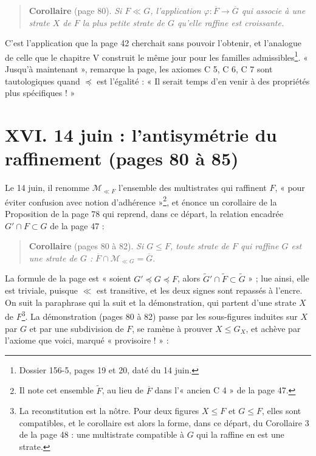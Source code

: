 \documentclass[11pt,a4paper]{article}
\begin{document}
\begin{quote}
\textbf{Corollaire} (page 80). \emph{Si $F \ll G$, l'application $\varphi :
\overline{F} \to \overline{G}$ qui associe à une strate $X$ de $F$ la plus
petite strate de $G$ qu'elle raffine est croissante.}
\end{quote}

C'est l'application que la page 42 cherchait sans pouvoir l'obtenir, et
l'analogue de celle que le chapitre V construit le même jour pour les familles
admissibles\footnote{Dossier 156-5, pages 19 et 20, daté du 14 juin.}.
« Jusqu'à maintenant », remarque la page, les axiomes C 5, C 6, C 7 sont
tautologiques quand $\preccurlyeq$ est l'égalité : « Il serait temps d'en venir
à des propriétés plus spécifiques ! »

\section*{XVI. 14 juin : l'antisymétrie du raffinement (pages 80 à 85)}

Le 14 juin, il renomme $\mathcal{M}_{\ll F}$ l'ensemble des multistrates qui
raffinent $F$, « pour éviter confusion avec notion d'adhérence »\footnote{Il
note cet ensemble $\widetilde{F}$, au lieu de $\overline{F}$ dans l'« ancien
C 4 » de la page 47.}, et énonce un corollaire de la Proposition de la page 78
qui reprend, dans ce départ, la relation encadrée $G' \cap F \subset G$ de la
page 47 :

\begin{quote}
\textbf{Corollaire} (pages 80 à 82). \emph{Si $G \leq F$, toute strate de $F$
qui raffine $G$ est une strate de $G$ :} $\overline{F} \cap \mathcal{M}_{\ll G} =
\overline{G}$.
\end{quote}

La formule de la page est « soient $G' \preccurlyeq G \preccurlyeq F$, alors
$\widetilde{G}' \cap \widetilde{F} \subset \widetilde{G}$ » ; lue ainsi, elle
est triviale, puisque $\ll$ est transitive, et les deux signes sont repassés à
l'encre. On suit la paraphrase qui la suit et la démonstration, qui partent
d'une strate $X$ de $F$\footnote{La reconstitution est la nôtre. Pour deux
figures $X \leq F$ et $G \leq F$, elles sont compatibles, et le corollaire est
alors la forme, dans ce départ, du Corollaire 3 de la page 48 : une
multistrate compatible à $G$ qui la raffine en est une strate.}. La
démonstration (pages 80 à 82) passe par les sous-figures induites sur $X$ par
$G$ et par une subdivision de $F$, se ramène à prouver $X \leq G_{X}$, et
achève par l'axiome que voici, marqué « provisoire ! » :
\end{document}
